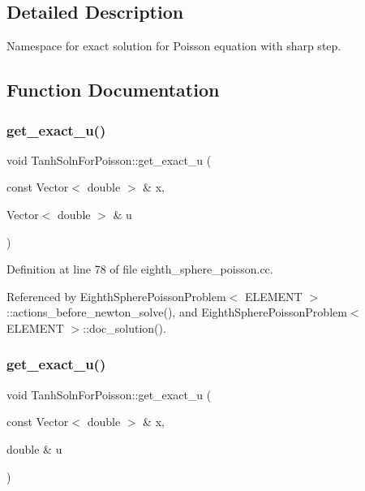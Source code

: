 \subsection{Detailed Description}
Namespace for exact solution for Poisson equation with sharp step. 

\subsection{Function Documentation}
\mbox{\label{namespaceTanhSolnForPoisson_af7896e9c18ce6438c73ae2a875e8b7de}} 
\subsubsection{\texorpdfstring{get\+\_\+exact\+\_\+u()}{get\_exact\_u()}\hspace{0.1cm}{\footnotesize\ttfamily [1/2]}}
{\footnotesize\ttfamily void Tanh\+Soln\+For\+Poisson\+::get\+\_\+exact\+\_\+u (\begin{DoxyParamCaption}\item[{const Vector$<$ double $>$ \&}]{x,  }\item[{Vector$<$ double $>$ \&}]{u }\end{DoxyParamCaption})}



Definition at line 78 of file eighth\+\_\+sphere\+\_\+poisson.\+cc.



Referenced by Eighth\+Sphere\+Poisson\+Problem$<$ E\+L\+E\+M\+E\+N\+T $>$\+::actions\+\_\+before\+\_\+newton\+\_\+solve(), and Eighth\+Sphere\+Poisson\+Problem$<$ E\+L\+E\+M\+E\+N\+T $>$\+::doc\+\_\+solution().

\mbox{\label{namespaceTanhSolnForPoisson_af197decab980d38d2037032780723984}} 
\subsubsection{\texorpdfstring{get\+\_\+exact\+\_\+u()}{get\_exact\_u()}\hspace{0.1cm}{\footnotesize\ttfamily [2/2]}}
{\footnotesize\ttfamily void Tanh\+Soln\+For\+Poisson\+::get\+\_\+exact\+\_\+u (\begin{DoxyParamCaption}\item[{const Vector$<$ double $>$ \&}]{x,  }\item[{double \&}]{u }\end{DoxyParamCaption})}



